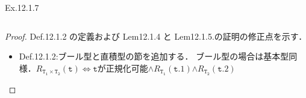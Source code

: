 \documentclass[9pt]{beamer}
\begin{document}
\begin{frame}{Ex.12.1.7}\begin{columns}
\begin{column}{0.5\columnwidth}
\end{column}
\begin{column}{0.5\columnwidth}
\end{column}
\end{columns}
\begin{proof}
Def.12.1.2 の定義および Lem12.1.4 と Lem12.1.5.の証明の修正点を示す．\begin{itemize}
\item Def.12.1.2:ブール型と直積型の節を追加する． ブール型の場合は基本型同様．$R_{\mathtt{T_{1}\times T_{2}}}(\mathtt{t})\Leftrightarrow \mathtt{t}$が正規化可能$\land R_{\mathtt{T_{1}}}(\mathtt{t}.1)$$\land R_{\mathtt{T_{2}}}(\mathtt{t}.2)$
\end{itemize}
\end{proof}
\end{frame}
\end{document}
